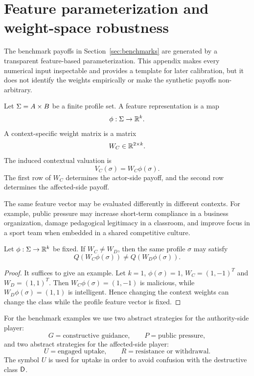 \section{Feature parameterization and weight-space robustness}
\label{sec:features}

The benchmark payoffs in Section~\ref{sec:benchmarks} are generated by a transparent feature-based parameterization. This appendix makes every numerical input inspectable and provides a template for later calibration, but it does not identify the weights empirically or make the synthetic payoffs non-arbitrary.

\begin{definition}
Let $\Sigma=A\times B$ be a finite profile set. A feature representation is a map
\[
\phi:\Sigma\to\mathbb{R}^k.
\]
A context-specific weight matrix is a matrix
\[
W_C\in\mathbb{R}^{2\times k}.
\]
The induced contextual valuation is
\[
V_C(\sigma)=W_C\phi(\sigma).
\]
The first row of $W_C$ determines the actor-side payoff, and the second row determines the affected-side payoff.
\end{definition}

The same feature vector may be evaluated differently in different contexts. For example, public pressure may increase short-term compliance in a business organization, damage pedagogical legitimacy in a classroom, and improve focus in a sport team when embedded in a shared competitive culture.

\begin{proposition}
Let $\phi:\Sigma\to\mathbb{R}^k$ be fixed. If $W_C\ne W_D$, then the same profile $\sigma$ may satisfy
\[
Q(W_C\phi(\sigma))\ne Q(W_D\phi(\sigma)).
\]
\end{proposition}

\begin{proof}
It suffices to give an example. Let $k=1$, $\phi(\sigma)=1$, $W_C=(1,-1)^T$ and $W_D=(1,1)^T$. Then $W_C\phi(\sigma)=(1,-1)$ is malicious, while $W_D\phi(\sigma)=(1,1)$ is intelligent. Hence changing the context weights can change the class while the profile feature vector is fixed.
\end{proof}

For the benchmark examples we use two abstract strategies for the authority-side player:
\[
G=\text{constructive guidance},\qquad P=\text{public pressure},
\]
and two abstract strategies for the affected-side player:
\[
U=\text{engaged uptake},\qquad R=\text{resistance or withdrawal}.
\]
The symbol $U$ is used for uptake in order to avoid confusion with the destructive class $\mathsf{D}$.

